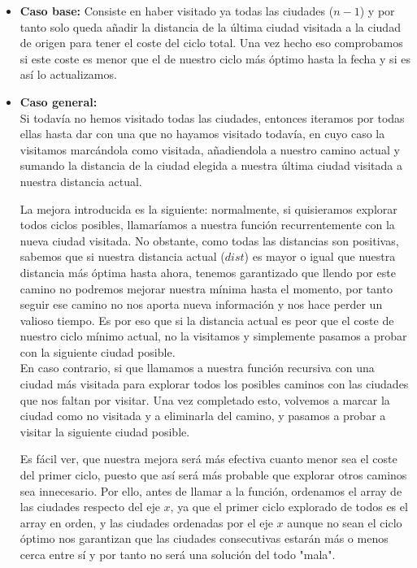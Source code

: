 \documentclass{article}
\begin{document}
\begin{itemize}
    \item \textbf{Caso base:} 
    \newline
    Consiste en haber visitado ya todas las ciudades ($n-1$) y por tanto solo queda añadir la distancia de la última ciudad visitada a la ciudad de origen para tener el coste del ciclo total. Una vez hecho eso comprobamos si este coste es menor que el de nuestro ciclo más óptimo hasta la fecha y si es así lo actualizamos.

    

    \item \textbf{Caso general:} \\
    Si todavía no hemos visitado todas las ciudades, entonces iteramos por todas ellas hasta dar con una que no hayamos visitado todavía, en cuyo caso la visitamos marcándola como visitada, añadiendola a nuestro camino actual y sumando la distancia de la ciudad elegida a nuestra última ciudad visitada a nuestra distancia actual. 
    
    La mejora introducida es la siguiente: normalmente, si quisieramos explorar todos ciclos posibles, llamaríamos a nuestra función recurrentemente con la nueva ciudad visitada. No obstante, como todas las distancias son positivas, sabemos que si nuestra distancia actual ($dist$) es mayor o igual que nuestra distancia más óptima hasta ahora, tenemos garantizado que llendo por este camino no podremos mejorar nuestra mínima hasta el momento, por tanto seguir ese camino no nos aporta nueva información y nos hace perder un valioso tiempo. Es por eso que si la distancia actual es peor que el coste de nuestro ciclo mínimo actual, no la visitamos y simplemente pasamos a probar con la siguiente ciudad posible. \\
    En caso contrario, si que llamamos a nuestra función recursiva con una ciudad más visitada para explorar todos los posibles caminos con las ciudades que nos faltan por visitar. Una vez completado esto, volvemos a marcar la ciudad como no visitada y a eliminarla del camino, y pasamos a probar a visitar la siguiente ciudad posible.
    
    Es fácil ver, que nuestra mejora será más efectiva cuanto menor sea el coste del primer ciclo, puesto que así será más probable que explorar otros caminos sea innecesario. Por ello, antes de llamar a la función, ordenamos el array de las ciudades respecto del eje $x$, ya que el primer ciclo explorado de todos es el array en orden, y las ciudades ordenadas por el eje $x$ aunque no sean el ciclo óptimo nos garantizan que las ciudades consecutivas estarán más o menos cerca entre sí y por tanto no será una solución del todo "mala".
    
\end{itemize}
\end{document}
